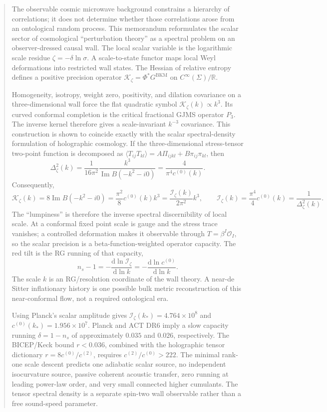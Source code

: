 \documentclass[11pt]{article}
\numberwithin{equation}{section}
\newcommand{\dd}{\mathrm d}
\newcommand{\BKM}{\mathrm{BKM}}
\newcommand{\Iz}{\mathcal I_\zeta}
\newcommand{\Kz}{\mathcal K_\zeta}
\newcommand{\cz}{c^{(0)}}
\newcommand{\ct}{c^{(2)}}
\begin{document}
\begin{abstract}
The observable cosmic microwave background constrains a hierarchy of correlations; it does not determine whether those correlations arose from an ontological random process. This memorandum reformulates the scalar sector of cosmological ``perturbation theory'' as a spectral problem on an observer-dressed causal wall. The local scalar variable is the logarithmic scale residue $\zeta=-\delta\ln\sigma$. A scale-to-state functor maps local Weyl deformations into restricted wall states. The Hessian of relative entropy defines a positive precision operator $\Kz=\Phi^*G^{\BKM}$ on $C^\infty(\Sigma)/\mathbb R$.

Homogeneity, isotropy, weight zero, positivity, and dilation covariance on a three-dimensional wall force the flat quadratic symbol $\Kz(k)\propto k^3$. Its curved conformal completion is the critical fractional GJMS operator $P_3$. The inverse kernel therefore gives a scale-invariant $k^{-3}$ covariance. This construction is shown to coincide exactly with the scalar spectral-density formulation of holographic cosmology. If the three-dimensional stress-tensor two-point function is decomposed as $\langle T_{ij}T_{kl}\rangle=A\Pi_{ijkl}+B\pi_{ij}\pi_{kl}$, then
\[
\Delta_\zeta^2(k)=\frac{1}{16\pi^2}\frac{k^3}{\operatorname{Im}B(-k^2-i0)}=\frac{4}{\pi^4\cz(k)}.
\]
Consequently,
\[
\boxed{\Kz(k)=8\operatorname{Im}B(-k^2-i0)=\frac{\pi^2}{8}\cz(k)k^3=\frac{\Iz(k)}{2\pi^2}k^3,}
\qquad
\boxed{\Iz(k)=\frac{\pi^4}{4}\cz(k)=\frac1{\Delta_\zeta^2(k)}.}
\]
The ``lumpiness'' is therefore the inverse spectral discernibility of local scale. At a conformal fixed point scale is gauge and the stress trace vanishes; a controlled deformation makes it observable through $T=\beta^I\mathcal O_I$, so the scalar precision is a beta-function-weighted operator capacity. The red tilt is the RG running of that capacity,
\[
n_s-1=-\frac{\dd\ln\Iz}{\dd\ln k}=-\frac{\dd\ln\cz}{\dd\ln k}.
\]
The scale $k$ is an RG/resolution coordinate of the wall theory. A near-de Sitter inflationary history is one possible bulk metric reconstruction of this near-conformal flow, not a required ontological era.

Using Planck's scalar amplitude gives $\Iz(k_*)=4.764\times10^8$ and $\cz(k_*)=1.956\times10^7$. Planck and ACT DR6 imply a slow capacity running $\delta=1-n_s$ of approximately $0.035$ and $0.026$, respectively. The BICEP/Keck bound $r<0.036$, combined with the holographic tensor dictionary $r=8\cz/\ct$, requires $\ct/\cz>222$. The minimal rank-one scale descent predicts one adiabatic scalar source, no independent isocurvature source, passive coherent acoustic transfer, zero running at leading power-law order, and very small connected higher cumulants. The tensor spectral density is a separate spin-two wall observable rather than a free sound-speed parameter.


\end{abstract}
\end{document}
